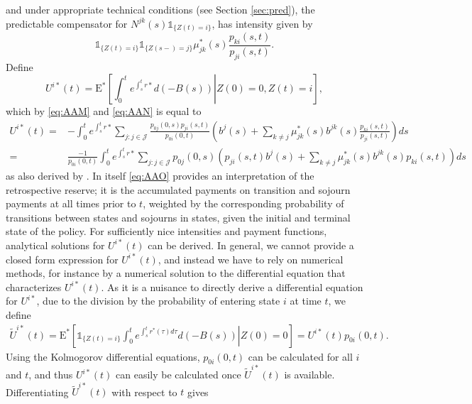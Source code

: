 \documentclass[12pt]{article}
\newcommand{\E}{\text{E}}
\newcommand{\indic}[1]{\mathds{1}_{ \{ #1 \} }}
\theoremstyle{my_thm}
\begin{document}
and under appropriate technical conditions (see Section \ref{sec:pred}), the predictable compensator for $N^{jk}(s)\indic{Z(t)=i}$, has intensity given by
\begin{equation}
\indic{Z(t)=i}\indic{Z(s-)=j}\mu^*_{jk}(s)\frac{p_{ki}(s,t)}{p_{ji}(s,t)}. \label{eq:AAN}
\end{equation}
Define
$$
U^{i*}(t)= \E^*  \left[ \left. \int_0^t e^{\int_s^t r*} d(-B(s)) \right| Z(0)=0, Z(t)=i \right],
$$
which by \eqref{eq:AAM} and \eqref{eq:AAN} is equal to
\begin{align}
U^{i*}(t)=& -\int_0^t e^{\int_s^t r*} \sum_{j:j \in \mathcal{J}} \frac{p_{0j}(0,s)p_{ji}(s,t)}{p_{0i}(0,t)} \left(  b^{j}(s) + \sum_{k \neq j}  \mu^*_{jk}(s) b^{jk}(s)\frac{p_{ki}(s,t)}{p_{ji}(s,t)} \right) ds
 \nonumber \\
=&
 \frac{-1}{p_{0i}(0,t)}\int_0^t e^{\int_s^t r*} \sum_{j:j \in \mathcal{J}} p_{0j}(0,s) \left(p_{ji}(s,t)   b^{j}(s) + \sum_{k \neq j}  \mu^*_{jk}(s) b^{jk}(s) p_{ki}(s,t) \right) ds \label{eq:AAO}
\end{align}
as also derived by \citet{Norberg}. In itself \eqref{eq:AAO} provides an interpretation of the retrospective reserve; it is the accumulated payments on transition and sojourn payments at all times prior to $t$, weighted by the corresponding probability of transitions between states and sojourns in states, given the initial and terminal state of the policy. For sufficiently nice intensities and payment functions, analytical solutions for $U^{i*}(t)$ can be derived. In general, we cannot provide a closed form expression for $U^{i*}(t)$, and instead we have to rely on numerical methods, for instance by a numerical solution to the differential equation that characterizes $U^{i*}(t)$. As it is a nuisance to directly derive a differential equation for $U^{i*}$, due to the division by the probability of entering state $i$ at time $t$, we define
\begin{align*}
\tilde{U}^{i*}(t)= \E^* \left. \left[ \indic{Z(t)=i} \int_0^t e^{\int_s^t r^*(\tau) d\tau} d(-B(s)) \right| Z(0)=0\right] = U^{i*}(t)p_{0i}(0,t).
\end{align*}
Using the Kolmogorov differential equations, $p_{0i}(0,t)$ can be calculated for all $i$ and $t$, and thus $U^{i*}(t)$ can easily be calculated once $\tilde{U}^{i*}(t)$ is available. Differentiating $\tilde{U}^{i*}(t)$ with respect to $t$ gives
\end{document}
